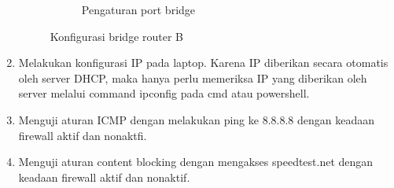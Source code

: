 \begin{enumerate}
\begin{figure}[H]
\begin{subfigure}[b]{0.4\linewidth}
			\caption{Pengaturan port bridge\label{fig:konfigurasiR2}}
		\end{subfigure}
		\caption{Konfigurasi bridge router B}
		\hspace{1cm}
	\end{figure}
	\item Melakukan konfigurasi IP pada laptop. Karena IP diberikan secara otomatis oleh server DHCP, maka hanya perlu memeriksa IP yang diberikan oleh server melalui command ipconfig pada cmd atau powershell.
	\item Menguji aturan ICMP dengan melakukan ping ke 8.8.8.8 dengan keadaan firewall aktif dan nonaktfi.
	\item Menguji aturan content blocking dengan mengakses speedtest.net dengan keadaan firewall aktif dan nonaktif.
\end{enumerate}
